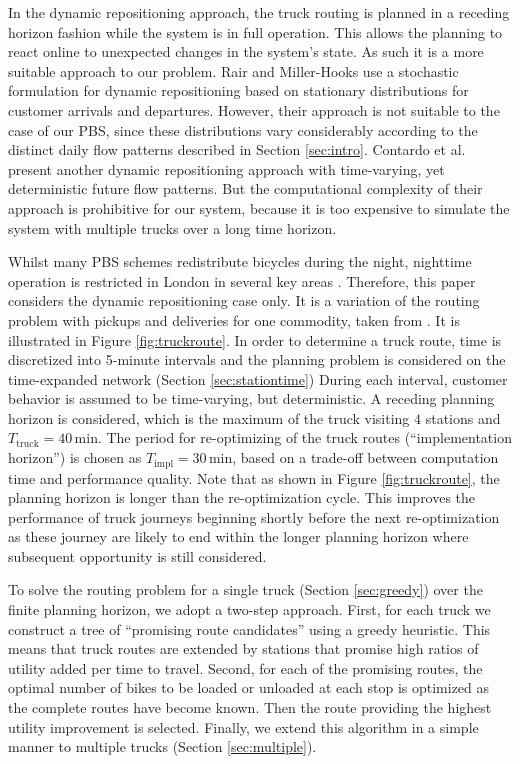 \documentclass{article}
\providecommand{\Ttruck}{T_{\textrm{truck}}}
\begin{document}
In the dynamic repositioning approach, the truck routing is planned in a
receding horizon fashion while the system is in full operation. This allows the
planning to react online to unexpected changes in the system's state. As such it
is a more suitable approach to our problem. Rair and Miller-Hooks
\cite{nair_fleet_2011} use a stochastic formulation for dynamic repositioning
based on stationary distributions for customer arrivals and departures. However,
their approach is not suitable to the case of our PBS, since these distributions
vary considerably according to the distinct daily flow patterns described in
Section \ref{sec:intro}. Contardo et al. \cite{contardo_balancing_2012} present
another dynamic repositioning approach with time-varying, yet deterministic
future flow patterns. But the computational complexity of their approach is
prohibitive for our system, because it is too expensive to simulate the system
with multiple trucks over a long time horizon.

Whilst many PBS schemes redistribute bicycles during the night, nighttime
operation is restricted in London in several key areas
\cite{redistribution_2012}. Therefore, this paper considers the dynamic
repositioning case only. It is a variation of the routing problem with pickups
and deliveries for one commodity, taken from \cite{berbeglia2010dynamic}. It is
illustrated in Figure \ref{fig:truckroute}. In order to determine a truck route,
time is discretized into 5-minute intervals and the planning problem is
considered on the time-expanded network (Section \ref{sec:stationtime}) During
each interval, customer behavior is assumed to be time-varying, but
deterministic. A receding planning horizon is considered, which is the maximum
of the truck visiting $4$ stations and $\Ttruck= 40\,\text{min}$. The period for
re-optimizing of the truck routes (``implementation horizon'') is chosen as
$T_{\textrm{impl}}=30\,\text{min}$, based on a trade-off between computation time and performance
quality. Note that as shown in Figure \ref{fig:truckroute}, the planning horizon
is longer than the re-optimization cycle. This improves the performance of truck
journeys beginning shortly before the next re-optimization as these journey are
likely to end within the longer planning horizon where subsequent opportunity is
still considered.

To solve the routing problem for a single truck (Section \ref{sec:greedy}) over
the finite planning horizon, we adopt a two-step approach. First, for each truck
we construct a tree of ``promising route candidates'' using a greedy heuristic.
This means that truck routes are extended by stations that promise high ratios
of utility added per time to travel. Second, for each of the promising routes,
the optimal number of bikes to be loaded or unloaded at each stop is optimized
as the complete routes have become known. Then the route providing the highest
utility improvement is selected. Finally, we extend this algorithm in a simple
manner to multiple trucks (Section \ref{sec:multiple}).
\end{document}
